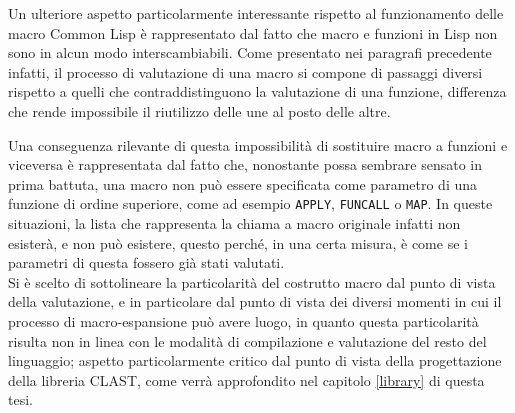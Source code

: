 Un ulteriore aspetto particolarmente interessante rispetto al funzionamento
delle macro Common Lisp è rappresentato dal fatto che macro e funzioni in Lisp
non sono in alcun modo interscambiabili. Come presentato nei paragrafi
precedente infatti, il processo di valutazione di una macro si compone di
passaggi diversi rispetto a quelli che contraddistinguono la valutazione di una
funzione, differenza che rende impossibile il riutilizzo delle une al posto
delle altre.

Una conseguenza rilevante di questa impossibilità di sostituire macro a funzioni
e viceversa è rappresentata dal fatto che, nonostante possa sembrare sensato in
prima battuta, una macro non può essere specificata come parametro di una
funzione di ordine superiore, come ad esempio \texttt{APPLY}, \texttt{FUNCALL} o
\texttt{MAP}. In queste situazioni, la lista che rappresenta la chiama a macro
originale infatti non esisterà, e non può esistere, questo perché, in una certa
misura, è come se i parametri di questa fossero già stati valutati.\\

Si è scelto di sottolineare la particolarità del costrutto macro dal punto di
vista della valutazione, e in particolare dal punto di vista dei diversi momenti
in cui il processo di macro-espansione può avere luogo, in quanto questa
particolarità risulta non in linea con le modalità di compilazione e valutazione
del resto del linguaggio; aspetto particolarmente critico dal punto di vista
della progettazione della libreria CLAST, come verrà approfondito nel capitolo
\ref{library} di questa tesi.
